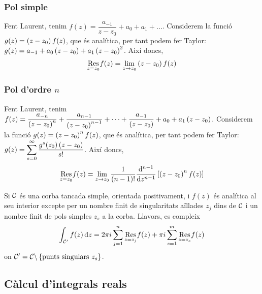 \subsubsection*{Pol simple}
Fent Laurent, tenim $f(z) = \dfrac{a_{-1}}{z-z_{0}} +a_{0} + a_{1} + \dots$. Considerem la funció $g(z) = \lrpar{z-z_{0}} f(z)$, que és analítica, per tant podem fer Taylor: $g(z) = a_{-1} + a_{0}\lrpar{z-z_{0}} + a_{1}\lrpar{z-z_{0}}^{2}$. Així doncs,
\begin{align}
	\underset{z=z_{0}}{\operatorname{Res}} f(z) = \lim_{z \to z_{0}} \lrpar{z-z_{0}} f(z)
\end{align}

\subsubsection*{Pol d'ordre $n$}
Fent Laurent, tenim $f(z) = \dfrac{a_{-n}}{\lrpar{z-z_{0}}^{n}} + \dfrac{a_{n-1}}{\lrpar{z-z_{0}}^{n-1}} + \dots + \dfrac{a_{-1}}{\lrpar{z-z_{0}}} + a_{0} + a_{1}\lrpar{z-z_{0}}$. Considerem la funció $g(z) = \lrpar{z-z_{0}}^{n} f(z)$, que és analítica, per tant podem fer Taylor: $ g(z) = \displaystyle \sum_{s=0}^{\infty} \dfrac{g^{s}(z_{0}) \lrpar{z-z_{0}}}{s!}$. Així doncs,
\begin{align}
	\underset{z=z_{0}}{\operatorname{Res}} f(z) = \lim_{z \to z_{0}} \frac{1}{(n-1)!} \der[n-1]{}{z} \lrbra{\lrpar{z-z_{0}}^{n} f(z)}
\end{align}

\begin{thm}
	Si $\mc{C}$ és una corba tancada simple, orientada positivament, i $f(z)$ és analítica al seu interior excepte per un nombre finit de singularitats aïllades $z_{j}$ dins de $\mc{C}$ i un nombre finit de pols simples $z_{s}$ a la corba. Llavors, es compleix
	\begin{align}
		\int_{\mc{C}'} f(z) \diff z = 2\pi i \sum_{j=1}^{n} \underset{z=z_{j}}{\operatorname{Res}} f(z) + \pi i \sum_{s=1}^{m} \underset{z=z_{s}}{\operatorname{Res}} f(z)
	\end{align}
	on $\mc{C}' = \mc{C}\backslash \lrcur{\text{punts singulars } z_{s}}$.
\end{thm}


\subsection{Càlcul d'integrals reals}
